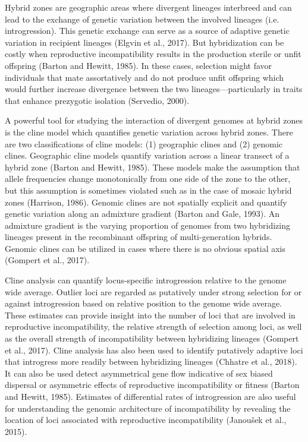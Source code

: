 Hybrid zones are geographic areas where divergent lineages interbreed and can 
lead to the exchange of genetic variation between the involved lineages (i.e. introgression). 
This genetic exchange can serve as a source of adaptive genetic variation in 
recipient lineages (Elgvin et al., 2017). But hybridization can be costly when 
reproductive incompatibility results in the production sterile or unfit offspring 
(Barton and Hewitt, 1985). In these cases, selection might favor individuals that 
mate assortatively and do not produce unfit offspring which would further increase 
divergence between the two lineages—particularly in traits that enhance prezygotic 
isolation (Servedio, 2000).

A powerful tool for studying the interaction of divergent genomes at hybrid zones 
is the cline model which quantifies genetic variation across hybrid zones. There 
are two classifications of cline models: (1) geographic clines and (2) genomic 
clines. Geographic cline models quantify variation across a linear transect of 
a hybrid zone (Barton and Hewitt, 1985). These models make the assumption that 
allele frequencies change monotonically from one side of the zone to the other, 
but this assumption is sometimes violated such as in the case of mosaic hybrid 
zones (Harrison, 1986). Genomic clines are not spatially explicit and quantify 
genetic variation along an admixture gradient (Barton and Gale, 1993). An 
admixture gradient is the varying proportion of genomes from two hybridizing 
lineages present in the recombinant offspring of multi-generation hybrids. 
Genomic clines can be utilized in cases where there is no obvious spatial axis 
(Gompert et al., 2017).

Cline analysis can quantify locus-specific introgression relative to the genome 
wide average. Outlier loci are regarded as putatively under strong selection for 
or against introgression based on relative position to the genome wide average. 
These estimates can provide insight into the number of loci that are involved in 
reproductive incompatibility, the relative strength of selection among loci, as 
well as the overall strength of incompatibility between hybridizing lineages 
(Gompert et al., 2017). Cline analysis has also been used to identify putatively 
adaptive loci that introgress more readily between hybridizing lineages (Chhatre et al., 2018). 
It can also be used detect asymmetrical gene flow indicative of sex biased 
dispersal or asymmetric effects of reproductive incompatibility or fitness 
(Barton and Hewitt, 1985). Estimates of differential rates of introgression 
are also useful for understanding the genomic architecture of incompatibility 
by revealing the location of loci associated with reproductive incompatibility (Janoušek et al., 2015).

